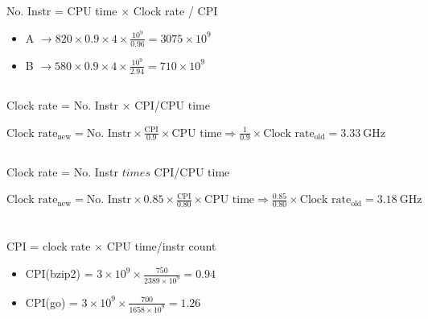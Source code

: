 \documentclass[11pt]{article}
\begin{document}
\section{}
\subsection{}
\begin{latin}
No. Instr = CPU time $\times$ Clock rate / CPI

\begin{itemize}
    \item A $\rightarrow 820 \times 0.9 \times 4 \times \frac{10^9}{0.96} = 3075 \times 10^9$
    
    \item B $\rightarrow 580 \times 0.9 \times 4 \times \frac{10^9}{2.94} = 710 \times 10^9$
\end{itemize}
\end{latin}

\subsection{}
\begin{latin}
\indent \indent Clock rate = No. Instr $\times$ CPI/CPU time

$\text{Clock rate}_{\text{new}} = \text{No. Instr} \times \frac{\text{CPI}}{0.9} \times \text{CPU time} \Rightarrow \frac{1}{0.9} \times \text{Clock rate}_{\text{old}} = 3.33 \ \text{GHz}$
\end{latin}

\subsection{}
\begin{latin}
\indent \indent Clock rate = No. Instr $times$ CPI/CPU time

$\text{Clock rate}_{\text{new}} = \text{No. Instr} \times 0.85 \times \frac{\text{CPI}}{0.80} \times \text{CPU time} \Rightarrow \frac{0.85}{0.80} \times \text{Clock rate}_{\text{old}} = 3.18 \ \text{GHz}$
\end{latin}

\section{}
\subsection{}
\begin{latin}
\indent \indent CPI = clock rate $\times$ CPU time/instr count

\begin{itemize}
    \item CPI(bzip2) = $3 \times 10^9 \times \frac{750}{2389 \times 10^9} = 0.94$
    
    \item CPI(go) = $3 \times 10^9 \times \frac{700}{1658 \times 10^9} = 1.26$
\end{itemize}
\end{latin}
\end{document}
